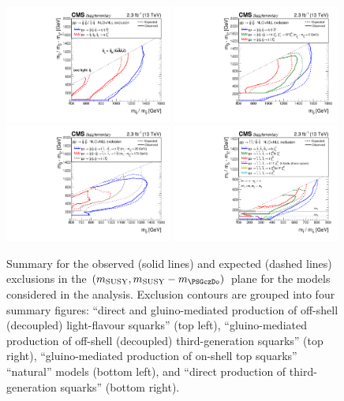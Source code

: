 \clearpage
\begin{figure}[!h]
  \begin{center}
    \includegraphics[width=0.49\textwidth]{mixSUMMARY_transposed_aux}
    \includegraphics[width=0.49\textwidth]{gluinoSUMMARY_transposed_aux} \\
    \includegraphics[width=0.49\textwidth]{naturalWT1SUMMARY_transposed_aux}
    \includegraphics[width=0.49\textwidth]{allThirdGenSUMMARY_transposed_aux} \\
    \caption{Summary for the observed (solid lines) and expected
      (dashed lines) exclusions in the 
      $(m_{\mathrm{SUSY}}, m_{\mathrm{SUSY}} - m_{\PSGczDo})$ plane for
      the models considered in the analysis. Exclusion contours are
      grouped into four summary figures: 
       ``direct and gluino-mediated production of off-shell
       (decoupled) light-flavour squarks'' (top left), 
       ``gluino-mediated production of off-shell (decoupled)
       third-generation squarks'' (top right), ``gluino-mediated
       production of on-shell top squarks'' \ie ``natural'' models
       (bottom left), and ``direct production of third-generation 
       squarks'' (bottom right). 
       \label{fig:summary-excl-plots} }
  \end{center}
\end{figure}


